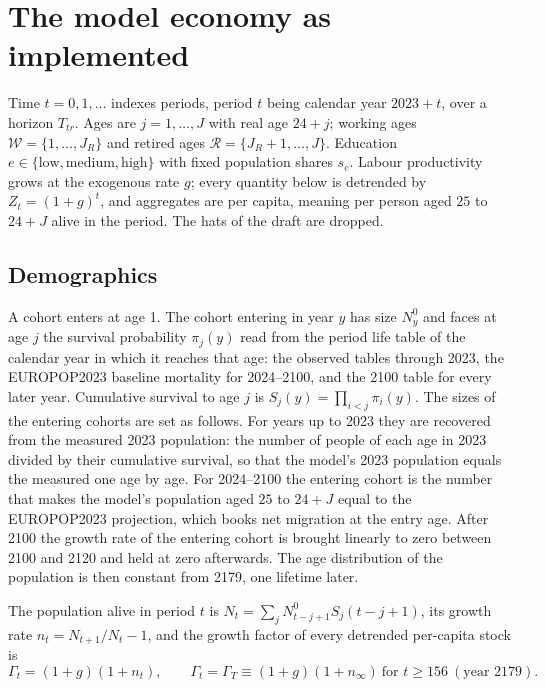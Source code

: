\documentclass[11pt,a4paper]{article}
\begin{document}
\section{The model economy as implemented}

Time $t = 0, 1, \dots$ indexes periods, period $t$ being calendar year $2023 + t$, over a horizon $T_{tr}$. Ages are $j = 1, \dots, J$ with real age $24 + j$; working ages $\mathcal{W} = \{1, \dots, J_R\}$ and retired ages $\mathcal{R} = \{J_R + 1, \dots, J\}$. Education $e \in \{\text{low}, \text{medium}, \text{high}\}$ with fixed population shares $s_e$. Labour productivity grows at the exogenous rate $g$; every quantity below is detrended by $Z_t = (1+g)^t$, and aggregates are per capita, meaning per person aged $25$ to $24 + J$ alive in the period. The hats of the draft are dropped.

\subsection{Demographics}

A cohort enters at age 1. The cohort entering in year $y$ has size $N^0_y$ and faces at age $j$ the survival probability $\pi_j(y)$ read from the period life table of the calendar year in which it reaches that age: the observed tables through 2023, the EUROPOP2023 baseline mortality for 2024--2100, and the 2100 table for every later year. Cumulative survival to age $j$ is $S_j(y) = \prod_{i<j} \pi_i(y)$. The sizes of the entering cohorts are set as follows. For years up to 2023 they are recovered from the measured 2023 population: the number of people of each age in 2023 divided by their cumulative survival, so that the model's 2023 population equals the measured one age by age. For 2024--2100 the entering cohort is the number that makes the model's population aged $25$ to $24 + J$ equal to the EUROPOP2023 projection, which books net migration at the entry age. After 2100 the growth rate of the entering cohort is brought linearly to zero between 2100 and 2120 and held at zero afterwards. The age distribution of the population is then constant from 2179, one lifetime later.

The population alive in period $t$ is $N_t = \sum_j N^0_{t-j+1} S_j(t-j+1)$, its growth rate $n_t = N_{t+1}/N_t - 1$, and the growth factor of every detrended per-capita stock is
\[
\Gamma_t = (1+g)(1+n_t), \qquad \Gamma_t = \Gamma_T \equiv (1+g)(1+n_\infty) \ \text{for } t \ge 156 \ (\text{year } 2179).
\]
\end{document}

